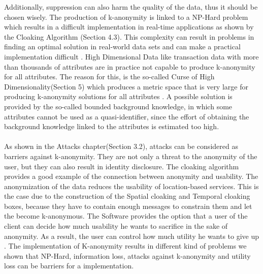 \documentclass{llncs}
\begin{document}
Additionally, suppression can also harm the quality of the data, thus it should be chosen wisely. The production of k-anonymity is linked to a NP-Hard problem which results in a difficult implementation in real-time applications as shown by the Cloaking Algorithm (Section 4.3). This complexity can result in problems in finding an optimal solution in real-world data sets and can make a practical implementation difficult \cite{meyerson2004complexity}. High Dimensional Data like transaction data with more than thousands of attributes are in practice not capable to produce k-anonymity for all attributes. The reason for this, is the so-called Curse of High Dimensionality(Section 5) which produces a metric space that is very large for producing k-anonymity solutions for all attributes \cite{aggarwal2005k}. A possible solution is provided by the so-called bounded background knowledge, in which some attributes cannot be used as a quasi-identifier, since the effort of obtaining the background knowledge linked to the attributes is estimated too high. \\\\

As shown in the Attacks chapter(Section 3.2), attacks can be considered as barriers against k-anonymity. They are not only a threat to the anonymity of the user, but they can also result in identity disclosure. The cloaking algorithm provides a good example of the connection between anonymity and usability. The anonymization of the data reduces the usability of location-based services. This is the case due to the construction of the Spatial cloaking and Temporal cloaking boxes, because they have to contain enough messages to constrain them and let the become k-anonymous. The Software provides the option that a user of the client can decide how much usability he wants to sacrifice in the sake of anonymity. As a result, the user can control how much utility he wants to give up \cite{gedik2004customizable}. The implementation of K-anonymity results in different kind of problems we shown that NP-Hard, information loss, attacks against k-anonymity and utility loss can be barriers for a implementation.

\newpage


\end{document}
